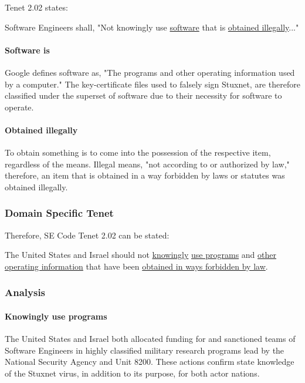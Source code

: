 \documentclass[12pt]{article}
\begin{document}
\begin{multicols}{2}
Tenet 2.02 states:
\begin{framed}
Software Engineers shall, "Not knowingly use \underline{software} that is \underline{obtained illegally}..."\cite{softwareEngineeringCodeOfEthics}
\end{framed}

\paragraph{Software is}
Google defines software as, "The programs and other operating information used by a computer."\cite{softwareDefinition} The key-certificate files used to falsely sign Stuxnet, are therefore classified under the superset of software due to their necessity for software to operate.

\paragraph{Obtained illegally}
To obtain something is to come into the possession of the respective item, regardless of the means. Illegal means, "not according to or authorized by law," therefore, an item that is obtained in a way forbidden by laws or statutes was obtained illegally.\cite{illegalDefinition}

\subsubsection{Domain Specific Tenet}

Therefore, SE Code Tenet 2.02 can be stated:
\begin{framed}
The United States and Israel should not \ul{knowingly} \ul{use programs} and \ul{other operating information} that have been \ul{obtained in ways forbidden by law}. 
\end{framed}

\subsubsection{Analysis}

\paragraph{Knowingly use programs}

The United States and Israel both allocated funding for and sanctioned teams of Software Engineers in highly classified military research programs lead by the National Security Agency and Unit 8200.\cite{NSAandUnit8200} These actions confirm state knowledge of the Stuxnet virus, in addition to its purpose, for both actor nations.


\end{multicols}
\end{document}
